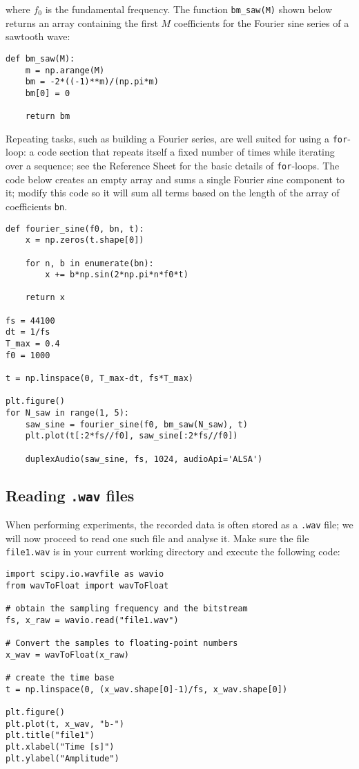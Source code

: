 where $f_0$ is the fundamental frequency. The function {\tt bm\_saw(M)} shown below returns an array containing the first $M$ coefficients for the Fourier sine series of a sawtooth wave:

\begin{lstlisting}[frame=single]
def bm_saw(M):
    m = np.arange(M)
    bm = -2*((-1)**m)/(np.pi*m)
    bm[0] = 0

    return bm
\end{lstlisting}


Repeating tasks, such as building a Fourier series, are well suited for using a {\tt for}-loop: a code section that repeats itself a fixed number of times while iterating over a sequence; see the Reference Sheet for the basic details of {\tt for}-loops. The code below creates an empty array and sums a single Fourier sine component to it; modify this code so it will sum all terms based on the length of the array of coefficients {\tt bn}.

\begin{lstlisting}[frame=single]
def fourier_sine(f0, bn, t):
    x = np.zeros(t.shape[0])

    for n, b in enumerate(bn):
        x += b*np.sin(2*np.pi*n*f0*t)

    return x

fs = 44100
dt = 1/fs
T_max = 0.4
f0 = 1000

t = np.linspace(0, T_max-dt, fs*T_max)

plt.figure()
for N_saw in range(1, 5):
    saw_sine = fourier_sine(f0, bm_saw(N_saw), t)
    plt.plot(t[:2*fs//f0], saw_sine[:2*fs//f0])

    duplexAudio(saw_sine, fs, 1024, audioApi='ALSA')
\end{lstlisting}


\subsection{Reading {\tt .wav} files}

When performing experiments, the recorded data is often stored as a {\tt .wav} file; we will now proceed to read one such file and analyse it. Make sure the file {\tt file1.wav} is in your current working directory and execute the following code:

\begin{lstlisting}[frame=single]
import scipy.io.wavfile as wavio
from wavToFloat import wavToFloat

# obtain the sampling frequency and the bitstream
fs, x_raw = wavio.read("file1.wav")

# Convert the samples to floating-point numbers
x_wav = wavToFloat(x_raw)

# create the time base
t = np.linspace(0, (x_wav.shape[0]-1)/fs, x_wav.shape[0])

plt.figure()
plt.plot(t, x_wav, "b-")
plt.title("file1")
plt.xlabel("Time [s]")
plt.ylabel("Amplitude")
\end{lstlisting}

